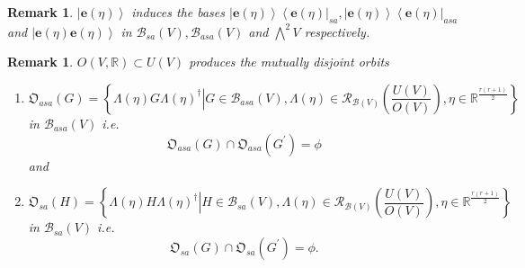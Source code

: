 \documentclass[aps,preprint]{revtex4}%
\newtheorem{remark}[theorem]{Remark}
\begin{document}
\begin{remark}
$\left\vert \mathbf{e}\left(  \mathbb{\eta}\right)  \right\rangle $ induces
the bases $\left\vert \mathbf{e}\left(  \mathbb{\eta}\right)  \right\rangle
\left\langle \mathbf{e}\left(  \mathbb{\eta}\right)  \right\vert
_{sa},\left\vert \mathbf{e}\left(  \mathbb{\eta}\right)  \right\rangle
\left\langle \mathbf{e}\left(  \mathbb{\eta}\right)  \right\vert _{asa}$ and
$\left\vert \mathbf{e}\left(  \mathbb{\eta}\right)  \mathbf{e}\left(
\mathbb{\eta}\right)  \right\rangle $ in $\mathcal{B}_{sa}\left(  V\right)
,\mathcal{B}_{asa}\left(  V\right)  $ and $%
{\textstyle\bigwedge\nolimits^{2}}
V$ respectively.
\end{remark}

\begin{remark}
$O\left(  V,\mathbb{R}\right)  \subset U\left(  V\right)  $ produces the
mutually \emph{disjoint} orbits

\begin{enumerate}
\item
\begin{equation}
\mathfrak{O}_{asa}\left(  G\right)  =\left\{  \left.  \Lambda\left(
\mathbb{\eta}\right)  G\Lambda\left(  \mathbb{\eta}\right)  ^{\dagger
}\right\vert G\in\mathcal{B}_{asa}\left(  V\right)  ,\Lambda\left(
\mathbb{\eta}\right)  \in\mathcal{R}_{\mathcal{B}\left(  V\right)  }\left(
\frac{U\left(  V\right)  }{O\left(  V\right)  }\right)  ,\mathbb{\eta\in
R}^{\frac{r\left(  r+1\right)  }{2}}\right\}
\end{equation}
in $\mathcal{B}_{asa}\left(  V\right)  $ i.e.
\begin{equation}
\mathfrak{O}_{asa}\left(  G\right)  \cap\mathfrak{O}_{asa}\left(  G^{\prime
}\right)  =\phi
\end{equation}
and

\item
\begin{equation}
\mathfrak{O}_{sa}\left(  H\right)  =\left\{  \left.  \Lambda\left(
\mathbb{\eta}\right)  H\Lambda\left(  \mathbb{\eta}\right)  ^{\dagger
}\right\vert H\in\mathcal{B}_{sa}\left(  V\right)  ,\Lambda\left(
\mathbb{\eta}\right)  \in\mathcal{R}_{\mathcal{B}\left(  V\right)  }\left(
\frac{U\left(  V\right)  }{O\left(  V\right)  }\right)  ,\mathbb{\eta\in
R}^{\frac{r\left(  r+1\right)  }{2}}\right\}
\end{equation}
in $\mathcal{B}_{sa}\left(  V\right)  $ i.e.
\begin{equation}
\mathfrak{O}_{sa}\left(  G\right)  \cap\mathfrak{O}_{sa}\left(  G^{\prime
}\right)  =\phi.
\end{equation}



\end{enumerate}
\end{remark}
\end{document}
